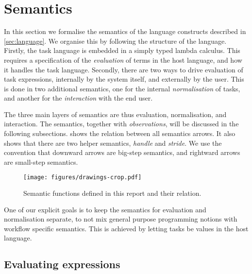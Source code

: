 


\section{Semantics}
\label{sec:semantics}


In this section we formalise the semantics of the language constructs described in \cref{sec:language}.
We organise this by following the structure of the language.
Firstly, the task language is embedded in a simply typed lambda calculus.
This requires a specification of the \emph{evaluation} of terms in the host language, and how it handles the task language.
Secondly, there are two ways to drive evaluation of task expressions, internally by the system itself, and externally by the user.
This is done in two additional semantics, one for the internal \emph{normalisation} of tasks, and another for the \emph{interaction} with the end user.

The three main layers of semantics are thus evaluation, normalisation, and interaction.
The semantics, together with \emph{observations}, will be discussed in the following subsections.
 shows the relation between all semantics arrows.
It also shows that there are two helper semantics, \emph{handle} and \emph{stride}.
We use the convention that downward arrows are big-step semantics, and rightward arrows are small-step semantics.

\begin{figure}[h]
  \centering
  \texttt{[image: figures/drawings-crop.pdf]}
  \caption{
    Semantic functions defined in this report and their relation.
  }
  \label{fig:semantic-functions}
\end{figure}

One of our explicit goals is to keep the semantics for evaluation and normalisation separate,
to not mix general purpose programming notions with workflow specific semantics.
This is achieved by letting tasks be values in the host language.



\subsection{Evaluating expressions}
\label{sec:evaluation}

